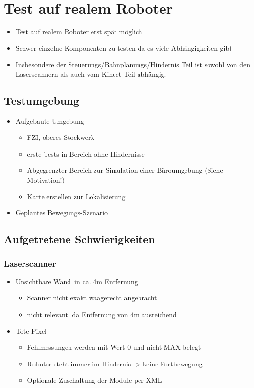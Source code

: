 
\chapter{Test auf realem Roboter}
\authorsection{\editortobias}

\begin{itemize}
	\item Test auf realem Roboter erst spät möglich
	\item Schwer einzelne Komponenten zu testen da es viele Abhängigkeiten gibt
	\item Insbesondere der Steuerungs/Bahnplanungs/Hindernis Teil ist sowohl von den Laserscannern als auch vom Kinect-Teil abhängig.
\end{itemize}


\section{Testumgebung}
\authorsection{\editortobias}
\begin{itemize}
	\item Aufgebaute Umgebung
	\begin{itemize}
		\item FZI, oberes Stockwerk
		\item erste Tests in Bereich ohne Hindernisse
		\item Abgegrenzter Bereich zur Simulation einer Büroumgebung (Siehe Motivation!)
		\item Karte erstellen zur Lokalisierung
	\end{itemize}
	\item Geplantes Bewegungs-Szenario
\end{itemize}


\section{Aufgetretene Schwierigkeiten}
\authorsection{\editorjulian}

\subsection{Laserscanner}

\begin{itemize}
	\item \glqq Unsichtbare Wand\grqq\ in ca. 4m Entfernung
	\begin{itemize}
		\item Scanner nicht exakt waagerecht angebracht
		\item nicht relevant, da Entfernung von 4m ausreichend
	\end{itemize}
	\item \glqq Tote Pixel\grqq
	\begin{itemize}
		\item Fehlmessungen werden mit Wert 0 und nicht MAX belegt
		\item Roboter steht immer im Hindernis -> keine Fortbewegung
		\item Optionale Zuschaltung der Module per XML
	\end{itemize}
\end{itemize}


